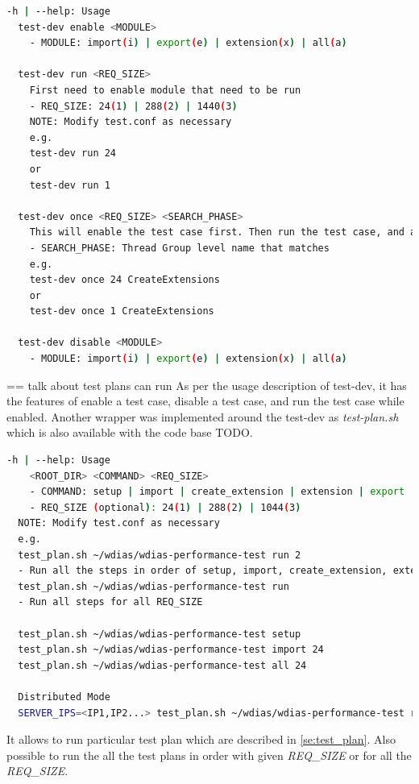 \begin{lstlisting}[language=sh, caption=Performance Test Help]
-h | --help: Usage
  test-dev enable <MODULE>
    - MODULE: import(i) | export(e) | extension(x) | all(a)

  test-dev run <REQ_SIZE>
    First need to enable module that need to be run
    - REQ_SIZE: 24(1) | 288(2) | 1440(3)
    NOTE: Modify test.conf as necessary
    e.g.
    test-dev run 24
    or
    test-dev run 1

  test-dev once <REQ_SIZE> <SEARCH_PHASE>
    This will enable the test case first. Then run the test case, and at the end disable and exit.
    - SEARCH_PHASE: Thread Group level name that matches
    e.g.
    test-dev once 24 CreateExtensions
    or
    test-dev once 1 CreateExtensions

  test-dev disable <MODULE>
    - MODULE: import(i) | export(e) | extension(x) | all(a)
\end{lstlisting}

== talk about test plans can run
As per the usage description of test-dev, it has the features of enable a test case, disable a test case, and run the test case while enabled.
Another wrapper was implemented around the test-dev as \emph{test-plan.sh} which is also available with the code base \cite{Haggett1998AnWales} TODO.

\begin{lstlisting}[language=sh, caption=Test Plan Help]
-h | --help: Usage
    <ROOT_DIR> <COMMAND> <REQ_SIZE>
    - COMMAND: setup | import | create_extension | extension | export | all | query
    - REQ_SIZE (optional): 24(1) | 288(2) | 1044(3)
  NOTE: Modify test.conf as necessary
  e.g.
  test_plan.sh ~/wdias/wdias-performance-test run 2
  - Run all the steps in order of setup, import, create_extension, extension, export, all, query
  test_plan.sh ~/wdias/wdias-performance-test run
  - Run all steps for all REQ_SIZE

  test_plan.sh ~/wdias/wdias-performance-test setup
  test_plan.sh ~/wdias/wdias-performance-test import 24
  test_plan.sh ~/wdias/wdias-performance-test all 24

  Distributed Mode
  SERVER_IPS=<IP1,IP2...> test_plan.sh ~/wdias/wdias-performance-test run
\end{lstlisting}

It allows to run particular test plan which are described in \ref{se:test_plan}. Also possible to run the all the test plans in order with given \emph{REQ\_SIZE} or for all the \emph{REQ\_SIZE}.

